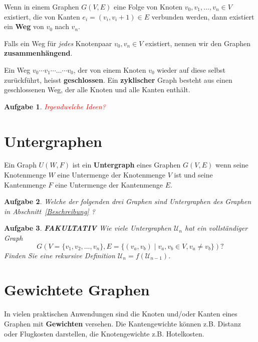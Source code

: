 \documentclass[12pt,a4paper]{report}
\theoremstyle{break}
\newtheorem{exercise}{Aufgabe}[section]
\theoremstyle{plain}
\begin{document}
Wenn in einem Graphen $G(V,E)$ eine Folge von Knoten $v_0, v_1,
\ldots, v_n \in V$ existiert, die von Kanten $e_i = (v_i, v_i+1) \in
E$ verbunden werden, dann existiert ein \textbf{Weg} von $v_0$ nach
$v_n$. 

Falls ein Weg f\"{u}r \emph{jedes} Knotenpaar $v_0, v_n
\in V$ existiert, nennen wir den Graphen \textbf{zusammenh\"{a}ngend}.

Ein Weg $v_0\cdots{v_1}\cdots\ldots\cdots{v_0}$, der von einem Knoten
$v_0$ wieder auf diese selbst zur\"{u}ckf\"{u}hrt, heisst
\textbf{geschlossen}. Ein \textbf{zyklischer} Graph besteht aus einen
geschlossenen Weg, der alle Knoten und alle Kanten enth\"{a}lt.

\begin{exercise}
\textcolor{red}{Irgendwelche Ideen?}
\end{exercise}

\section{Untergraphen}

Ein Graph $U(W,F)$ ist ein \textbf{Untergraph} eines Graphen $G(V,E)$
wenn seine Knotenmenge $W$ eine Untermenge der Knotenmenge $V$ ist und
seine Kantenmenge $F$ eine Untermenge der Kantenmenge $E$.

\begin{exercise}
Welche der folgenden drei Graphen sind Untergraphen des Graphen in
Abschnitt~\ref{Beschreibung} ?


\end{exercise}
\begin{exercise}
\textbf{FAKULTATIV} Wie viele Untergraphen $\mathcal{U}_n$ hat ein
\emph{vollst\"{a}ndiger} Graph 
\[ 
G(V = \{v_1, v_2, \ldots, v_n\}, E = \{(v_a, v_b) \mid v_a, v_b \in V,
v_a \neq v_b\}) ?
\] 
Finden Sie eine rekursive Definition $\mathcal{U}_n = f(\mathcal{U}_{n-1})$.
\end{exercise}

\newpage
\section{Gewichtete Graphen}
\label{gewichtet}

In vielen praktischen Anwendungen sind die Knoten und/oder Kanten
eines Graphen mit \textbf{Gewichten} versehen. Die Kantengewichte k\"{o}nnen
z.B. Distanz oder Flugkosten darstellen, die Knotengewichte
z.B. Hotelkosten.
\end{document}
